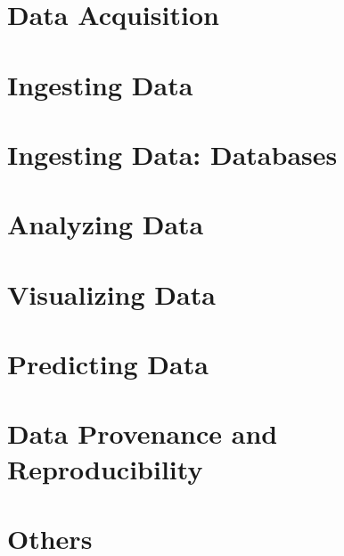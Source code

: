 \chapter{Data Acquisition}





\chapter{Ingesting Data}



\chapter{Ingesting Data: Databases}





\chapter{Analyzing Data}



\chapter{Visualizing Data}





\chapter{Predicting Data}



\chapter{Data Provenance and Reproducibility}




\chapter{Others}





